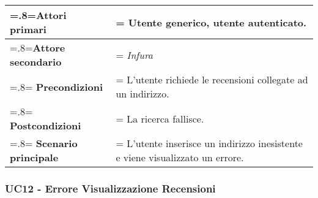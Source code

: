             \begin{center}
                \renewcommand{\arraystretch}{1.5}
                \renewcommand\tabularxcolumn[1]{m{#1}}
                \begin{tabularx}{0.9\textwidth} {
                    >{\hsize=.8\hsize\linewidth=\hsize}X
                    >{\hsize=1.2\hsize\linewidth=\hsize}X}
                    \hline
                    \textbf{Attori primari} & Utente generico, utente autenticato. \\
                    \hline
                    \textbf{Attore secondario} & \textit{Infura} \\
                    \hline
                    \textbf{Precondizioni} & L'utente richiede le recensioni collegate ad un indirizzo. \\
                    \hline
                    \textbf{Postcondizioni} & La ricerca fallisce. \\
                    \hline
                    \textbf{Scenario principale} & L'utente inserisce un indirizzo inesistente e viene visualizzato un errore. \\
                    \hline
                \end{tabularx}
            \end{center}

        \subsubsection{UC12 - Errore Visualizzazione Recensioni}
        \label{UC12}

